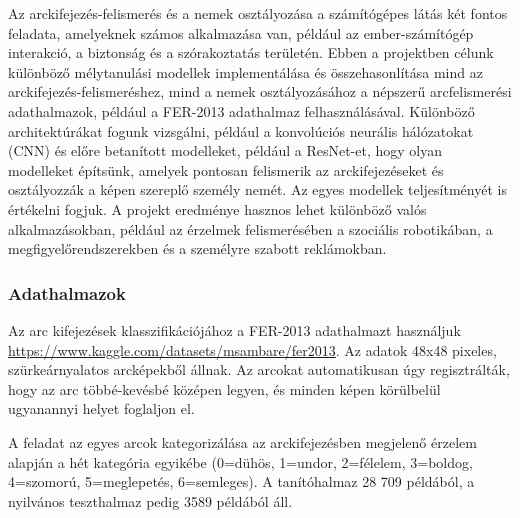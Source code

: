 \documentclass[12pt,a4]{article}
\begin{document}
            Az arckifejezés-felismerés és a nemek osztályozása a számítógépes látás két fontos feladata, amelyeknek számos alkalmazása van, például az ember-számítógép interakció, a biztonság és a szórakoztatás területén. Ebben a projektben célunk különböző mélytanulási modellek implementálása és összehasonlítása mind az arckifejezés-felismeréshez, mind a nemek osztályozásához a népszerű arcfelismerési adathalmazok, például a FER-2013 adathalmaz felhasználásával. Különböző architektúrákat fogunk vizsgálni, például a konvolúciós neurális hálózatokat (CNN) és előre betanított modelleket, például a ResNet-et, hogy olyan modelleket építsünk, amelyek pontosan felismerik az arckifejezéseket és osztályozzák a képen szereplő személy nemét. Az egyes modellek teljesítményét is értékelni fogjuk. A projekt eredménye hasznos lehet különböző valós alkalmazásokban, például az érzelmek felismerésében a szociális robotikában, a megfigyelőrendszerekben és a személyre szabott reklámokban.
        
            \subsubsection{Adathalmazok}
                Az arc kifejezések klasszifikációjához a FER-2013 adathalmazt használjuk \url{https://www.kaggle.com/datasets/msambare/fer2013}. Az adatok 48x48 pixeles, szürkeárnyalatos arcképekből állnak. Az arcokat automatikusan úgy regisztrálták, hogy az arc többé-kevésbé középen legyen, és minden képen körülbelül ugyanannyi helyet foglaljon el.
                
                A feladat az egyes arcok kategorizálása az arckifejezésben megjelenő érzelem alapján a hét kategória egyikébe (0=dühös, 1=undor, 2=félelem, 3=boldog, 4=szomorú, 5=meglepetés, 6=semleges). A tanítóhalmaz 28 709 példából, a nyilvános teszthalmaz pedig 3589 példából áll.
                
\end{document}
